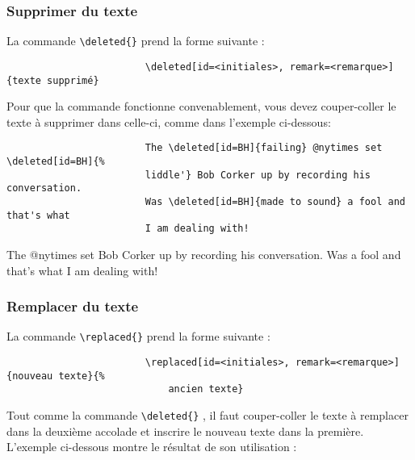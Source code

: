 \documentclass[french]{article}
\newcommand{\cmd}[1]{%
	\texttt{\textbackslash#1\{\}}
}
\begin{document}
			\subsubsection{Supprimer du texte}
			
				La commande \cmd{deleted} prend la forme suivante :
				
				\begin{shaded*}
					\begin{verbatim}
						\deleted[id=<initiales>, remark=<remarque>]{texte supprimé}
					\end{verbatim}
				\end{shaded*}
			
				Pour que la commande fonctionne convenablement, vous devez couper-coller le texte à supprimer
				dans celle-ci, comme dans l'exemple ci-dessous:
				
				\begin{shaded*}
					\begin{verbatim}
						The \deleted[id=BH]{failing} @nytimes set \deleted[id=BH]{%
						liddle'} Bob Corker up by recording his conversation. 
						Was \deleted[id=BH]{made to sound} a fool and that's what 
						I am dealing with!
					\end{verbatim}
				\end{shaded*}
			
				\begin{leftbar}
					The  @nytimes set  Bob Corker 
					up by recording his conversation. 
					Was  a fool and that's what 
					I am dealing with!
				\end{leftbar}
			
			\subsubsection{Remplacer du texte}
			
				La commande \cmd{replaced} prend la forme suivante :
				
				\begin{shaded*}
					\begin{verbatim}
						\replaced[id=<initiales>, remark=<remarque>]{nouveau texte}{%
						    ancien texte}
					\end{verbatim}
				\end{shaded*}
			
				Tout comme la commande \cmd{deleted}, il faut couper-coller le texte à remplacer
				dans la deuxième accolade et inscrire le nouveau texte dans la première. L'exemple
				ci-dessous montre le résultat de son utilisation :
				
\end{document}
